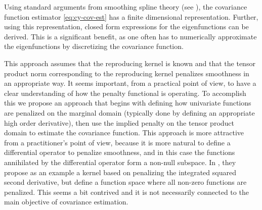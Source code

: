 Using standard arguments from smoothing spline theory (see \cite{Wahba:1990}), the covariance function estimator \eqref{eq:cy-cov-est} has a finite dimensional representation. Further, using this representation, closed form expressions for the eigenfunctions can be derived. This is a significant benefit, as one often has to numerically approximate the eigenfunctions by discretizing the covariance function. 


This approach assumes that the reproducing kernel is known and that the tensor product norm corresponding to the reproducing kernel penalizes smoothness in an appropriate way. It seems important, from a practical point of view, to have a clear understanding of how the penalty functional is operating. To accomplish this we propose an approach that begins with defining how univariate functions are penalized on the marginal domain (typically done by defining an appropriate high order derivative), then use the implied penalty on the tensor product domain to estimate the covariance function. This approach is more attractive from a practitioner's point of view, because it is more natural to define a differential operator to penalize smoothness, and in this case the functions annihilated by the differential operator form a non-null subspace. In \cite{Cai:2010vr}, they propose as an example a kernel based on penalizing the integrated squared second derivative, but define a function space where all non-zero functions are penalized. This seems a bit contrived and it is not necessarily connected to the main objective of covariance estimation. 

